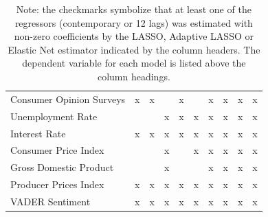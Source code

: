 \begin{landscape}
\begin{table}[]
\begin{adjustbox}{max width=\linewidth}
\begin{tabular}{llllllllll}
Consumer Opinion Surveys & x         & x                 &                & x        &                  & x            & x       & x                & x            \\
Unemployment Rate        &           &                   & x              & x        & x                & x            & x       & x                & x            \\
Interest Rate            & x         & x                 & x              & x        & x                & x            & x       & x                & x            \\
Consumer Price Index     &           &                   & x              &          & x                & x            & x       & x                & x            \\
Gross Domestic Product   &           &                   & x              &          &                  & x            & x       & x                & x            \\
Producer Prices Index    & x         & x                 & x              & x        & x                & x            & x       & x                & x            \\ \hline
VADER Sentiment          & x         & x                 & x              & x        & x                & x            & x       & x                & x \\ \hline    
\end{tabular}
\end{adjustbox}
\caption*{Note: the checkmarks symbolize that at least one of the regressors (contemporary or 12 lags) was estimated with non-zero coefficients by the LASSO, Adaptive LASSO or Elastic Net estimator indicated by the column headers. The dependent variable for each model is listed above the column headings.}
\end{table}
\end{landscape}



